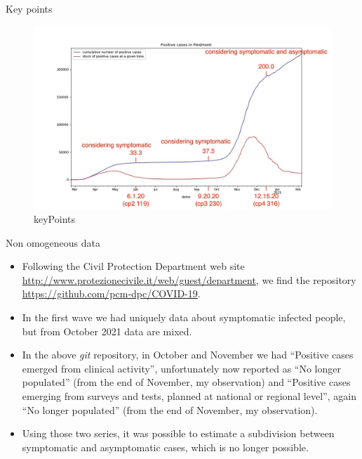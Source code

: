 \documentclass[8pt]{beamer}
\begin{document}
\begin{frame}{Key points}

\begin{figure}[H]
\center
\includegraphics[scale=0.25]{andamento900annotato.jpg}
\caption{keyPoints} 
\label{Key points}
\end{figure}


\end{frame}

\begin{frame}{Non omogeneous data}

\begin{itemize}

\item Following the Civil Protection Department web site \url{http://www.protezionecivile.it/web/guest/department}, we find the
 repository \url{https://github.com/pcm-dpc/COVID-19}.
 
 \item In the first wave we had uniquely data about symptomatic infected people, but from October 2021 data are mixed.
 
 \item In the above \emph{git}  repository, in October and November we had ``Positive cases emerged from clinical activity'', unfortunately now reported as ``No longer populated'' (from the end of November, my observation) and ``Positive cases emerging from surveys and tests, planned at national or regional level'', again ``No longer populated'' (from the end of November, my observation).
 
 \item Using those two series, it was possible to estimate a subdivision between symptomatic and asymptomatic cases, which is no longer possible.
 
\end{itemize}

\end{frame}
\end{document}
